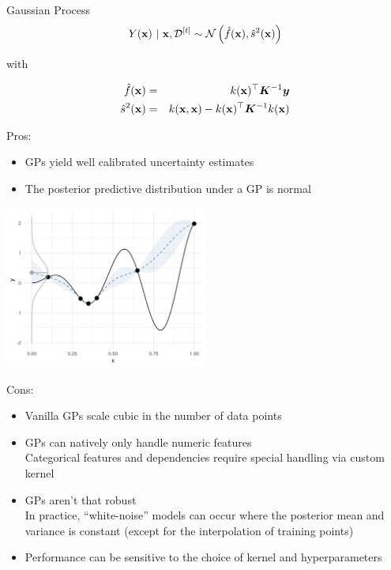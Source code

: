 \documentclass[11pt,compress,t,notes=noshow, xcolor=table]{beamer}
\begin{document}
\begin{vbframe}{Gaussian Process}
\begin{eqnarray*}
  Y(\mathbf{x}) ~|~ \mathbf{x}, \mathcal{D}^{[t]} \sim \mathcal{N}\left(\hat{f}(\mathbf{x}), \hat{s}^2(\mathbf{x})\right)
\end{eqnarray*}

with 

\begin{eqnarray*}
  \hat{f}(\mathbf{x}) &=& k(\mathbf{x})^\top \bm{K}^{-1} \bm{y} \\
  \hat{s}^2(\mathbf{x}) &=& k(\mathbf{x}, \mathbf{x}) - k(\mathbf{x})^\top \bm{K}^{-1} k(\mathbf{x})
\end{eqnarray*}

\vfill

\framebreak

Pros:
\begin{itemize}
  \item GPs yield well calibrated uncertainty estimates
  \item The posterior predictive distribution under a GP is normal
\end{itemize}

\begin{center}
\includegraphics[width = 0.5\textwidth]{figure_man/bayesian_loop_sm_normal.png}
\end{center}
\framebreak

Cons:
\begin{itemize}
  \item Vanilla GPs scale cubic in the number of data points
  \item GPs can natively only handle numeric features\\
    Categorical features and dependencies require special handling via custom kernel
  \item GPs aren't that robust\\
    In practice, \enquote{white-noise} models can occur where the posterior mean and variance is constant (except for the interpolation of training points)
  \item Performance can be sensitive to the choice of kernel and hyperparameters
\end{itemize}

\end{vbframe}
\end{document}
